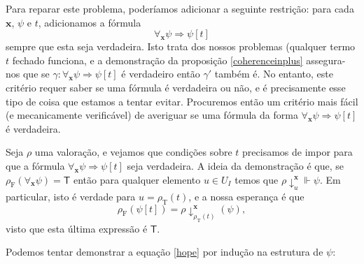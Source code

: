\documentclass{report}
\theoremstyle{definition}
\theoremstyle{remark}
\renewcommand{\bf}[1]{\mathbf{#1}}
\newcommand{\F}{\mathrm{F}}
\newcommand{\T}{\mathrm{T}}
\newcommand{\lt}{\mathsf{T}}
\newcommand{\imply}{\mathbin{\Rightarrow}}
\begin{document}
	Para reparar este problema, poderíamos adicionar a seguinte restrição: para cada $\bf x$, $\psi$ e $t$, adicionamos a fórmula
\[\forall_{\bf x} \psi \imply \psi[t]\]
	sempre que esta seja verdadeira. Isto trata dos nossos problemas (qualquer termo $t$ fechado funciona, e a demonstração da proposição \ref{coherenceinplus} assegura-nos que se $\gamma : \forall_{\bf x} \psi \imply \psi[t]$ é verdadeiro então $\gamma'$ também é. No entanto, este critério requer saber se uma fórmula é verdadeira ou não, e é precisamente esse tipo de coisa que estamos a tentar evitar. Procuremos então um critério mais fácil (e mecanicamente verificável) de averiguar se uma fórmula da forma $\forall_{\bf x} \psi \imply \psi[t]$ é verdadeira.

	Seja $\rho$ uma valoração, e vejamos que condições sobre $t$ precisamos de impor para que a fórmula $\forall_{\bf x} \psi \imply \psi[t]$ seja verdadeira. A ideia da demonstração é que, se $\rho_\F(\forall_{\bf x} \psi) = \lt$ então para qualquer elemento $u \in U_I$ temos que $\rho\!\downarrow^{\bf x}_u \Vdash \psi$. Em particular, isto é verdade para $u = \rho_\T(t)$, e a nossa esperança é que
\begin{equation}\label{hope}
\rho_\F(\psi[t]) = \rho\!\downarrow^{\bf x}_{\rho_\T(t)}(\psi),
\end{equation}
visto que esta última expressão é $\lt$.

	Podemos tentar demonstrar a equação \eqref{hope} por indução na estrutura de $\psi$:
\end{document}
